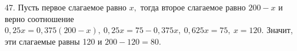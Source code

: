 47. Пусть первое слагаемое равно $x,$ тогда второе слагаемое равно $200-x$ и верно соотношение $0,25x=0,375(200-x),\ 0,25x=75-0,375x,\ 0,625x=75,\ x=120.$ Значит, эти слагаемые равны 120 и $200-120=80.$\\
